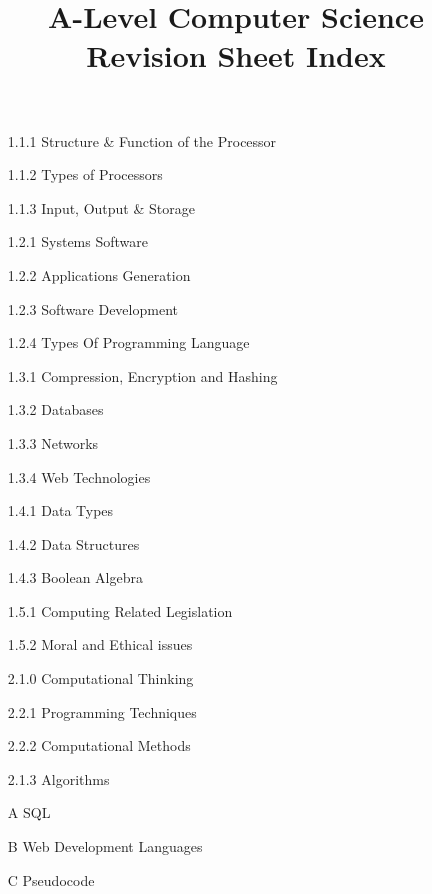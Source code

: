 \documentclass[a4paper,11pt, twocolumn]{article}
\title{\textbf{A-Level Computer Science}\\ Revision Sheet Index}
\author{}
\date{}
\begin{document}
\maketitle
\thispagestyle{fancy}

\begin{enumerate}
    \item[1.1.1] Structure \& Function of the Processor
    \item[1.1.2] Types of Processors
    \item[1.1.3] Input, Output \& Storage 
    \item[1.2.1] Systems Software
    \item[1.2.2] Applications Generation
    \item[1.2.3] Software Development
    \item[1.2.4] Types Of Programming Language
    \item[1.3.1] Compression, Encryption and Hashing
    \item[1.3.2] Databases
    \item[1.3.3] Networks
    \item[1.3.4] Web Technologies
    \item[1.4.1] Data Types
    \item[1.4.2] Data Structures
    \item[1.4.3] Boolean Algebra
    \item[1.5.1] Computing Related Legislation
    \item[1.5.2] Moral and Ethical issues
    \item[2.1.0] Computational Thinking
    \item[2.2.1] Programming Techniques
    \item[2.2.2] Computational Methods
    \item[2.1.3] Algorithms
    \item[A] SQL
    \item[B] Web Development Languages
    \item[C] Pseudocode
\end{enumerate}
\end{document}
